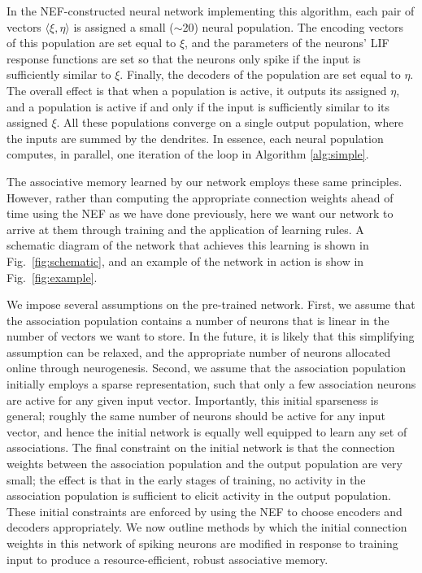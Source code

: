 \documentclass[10pt,letterpaper]{article}
\newcommand{\fg}{Fig.}
\begin{document}
In the NEF-constructed neural network implementing this algorithm, each pair of vectors $\langle\xi, \eta\rangle$ is assigned a small ($\sim$20) neural population. The encoding vectors of this population are set equal to $\xi$, and the parameters of the neurons' LIF response functions are set so that the neurons only spike if the input is sufficiently similar to $\xi$. Finally, the decoders of the population are set equal to $\eta$. The overall effect is that when a population is active, it outputs its assigned $\eta$, and a population is active if and only if the input is sufficiently similar to its assigned $\xi$. All these populations converge on a single output population, where the inputs are summed by the dendrites. In essence, each neural population computes, in parallel, one iteration of the loop in Algorithm \ref{alg:simple}.

The associative memory learned by our network employs these same principles. However, rather than computing the appropriate connection weights ahead of time using the NEF as we have done previously, here we want our network to arrive at them through training and the application of learning rules. A schematic diagram of the network that achieves this learning is shown in \fg~\ref{fig:schematic}, and an example of the network in action is show in \fg~\ref{fig:example}. 

We impose several assumptions on the pre-trained network. First, we assume that the association population contains a number of neurons that is linear in the number of vectors we want to store. In the future, it is likely that this simplifying assumption can be relaxed, and the appropriate number of neurons allocated online through neurogenesis. Second, we assume that the association population initially employs a sparse representation, such that only a few association neurons are active for any given input vector. Importantly, this initial sparseness is general; roughly the same number of neurons should be active for any input vector, and hence the initial network is equally well equipped to learn any set of associations. The final constraint on the initial network is that the connection weights between the association population and the output population are very small; the effect is that in the early stages of training, no activity in the association population is sufficient to elicit activity in the output population. These initial constraints are enforced by using the NEF to choose encoders and decoders appropriately. We now outline methods by which the initial connection weights in this network of spiking neurons are modified in response to training input to produce a resource-efficient, robust associative memory.
\end{document}
